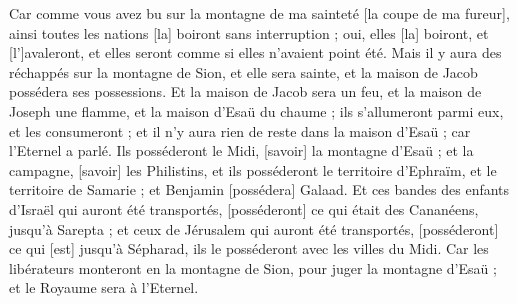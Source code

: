 \begin{multicols}{2}
Car comme vous avez bu sur la montagne de ma sainteté [la coupe de ma fureur], ainsi toutes les nations [la] boiront sans interruption ; oui, elles [la] boiront, et [l']avaleront, et elles seront comme si elles n'avaient point été.
Mais il y aura des réchappés sur la montagne de Sion, et elle sera sainte, et la maison de Jacob possédera ses possessions.
Et la maison de Jacob sera un feu, et la maison de Joseph une flamme, et la maison d'Esaü du chaume ; ils s'allumeront parmi eux, et les consumeront ; et il n'y aura rien de reste dans la maison d'Esaü ; car l'Eternel a parlé.
Ils posséderont le Midi, [savoir] la montagne d'Esaü ; et la campagne, [savoir] les Philistins, et ils posséderont le territoire d'Ephraïm, et le territoire de Samarie ; et Benjamin [possédera] Galaad.
Et ces bandes des enfants d'Israël qui auront été transportés, [posséderont] ce qui était des Cananéens, jusqu'à Sarepta ; et ceux de Jérusalem qui auront été transportés, [posséderont] ce qui [est] jusqu'à Sépharad, ils le posséderont avec les villes du Midi.
Car les libérateurs monteront en la montagne de Sion, pour juger la montagne d'Esaü ; et le Royaume sera à l'Eternel.
\PPE{}
\end{multicols}
